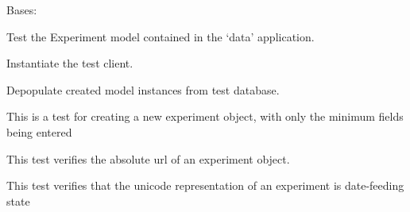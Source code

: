 \documentclass[letterpaper,10pt,english]{sphinxmanual}
\begin{document}
\begin{fulllineitems}
\label{api:data.tests.ExperimentModelTests}
Bases: 

Test the Experiment model contained in the `data' application.

\begin{fulllineitems}
\label{api:data.tests.ExperimentModelTests.setUp}
Instantiate the test client.

\end{fulllineitems}


\begin{fulllineitems}
\label{api:data.tests.ExperimentModelTests.tearDown}
Depopulate created model instances from test database.

\end{fulllineitems}


\begin{fulllineitems}
\label{api:data.tests.ExperimentModelTests.test_create_experiment_minimal}
This is a test for creating a new experiment object, with only the minimum fields being entered

\end{fulllineitems}


\begin{fulllineitems}
\label{api:data.tests.ExperimentModelTests.test_experiment_get_absolute_url}
This test verifies the absolute url of an experiment object.

\end{fulllineitems}


\begin{fulllineitems}
\label{api:data.tests.ExperimentModelTests.test_experiment_unicode}
This test verifies that the unicode representation of an experiment is date-feeding state

\end{fulllineitems}


\end{fulllineitems}
\end{document}
